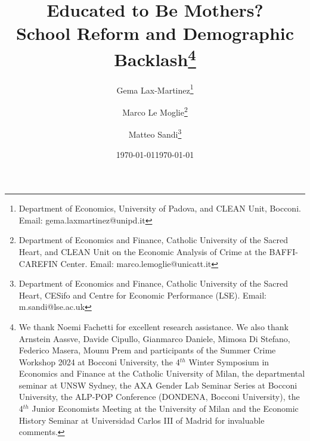 \documentclass[a4paper,oneside,final,onecolumn,12pt,english]{article}
\date{\today}
\begin{document}
\begin{titlepage}

\title{\huge Educated to Be Mothers? \\ School Reform and Demographic Backlash\thanks{\footnotesize We thank Noemi Fachetti for excellent research assistance. We also thank Arnstein Aassve, Davide Cipullo, Gianmarco Daniele, Mimosa Di Stefano, Federico Masera, Mounu Prem and participants of the Summer Crime Workshop 2024 at Bocconi University, the 4$^{th}$ Winter Symposium in Economics and Finance at the Catholic University of Milan, the departmental seminar at UNSW Sydney, the AXA Gender Lab Seminar Series at Bocconi University, the ALP-POP Conference (DONDENA, Bocconi University), the 4$^{th}$ Junior Economists Meeting at the University of Milan and the Economic History Seminar at Universidad Carlos III of Madrid for invaluable comments.} \vspace{-0.2cm}}
 
\date{\today \vspace{0.8cm}}

\author{
Gema Lax-Martinez\thanks{Department of Economics, University of Padova, and CLEAN Unit, Bocconi. Email: gema.laxmartinez@unipd.it} \and Marco Le Moglie\thanks{Department of Economics and Finance, Catholic University of the Sacred Heart, and CLEAN Unit on the Economic Analysis of Crime at the BAFFI-CAREFIN Center. Email: marco.lemoglie@unicatt.it} \and Matteo Sandi\thanks{Department of Economics and Finance, Catholic University of the Sacred Heart, CESifo and Centre for Economic Performance (LSE). Email: m.sandi@lse.ac.uk}\\ 
        }
        
        
\maketitle

\vspace{-0.3cm}



\end{titlepage}
\end{document}
